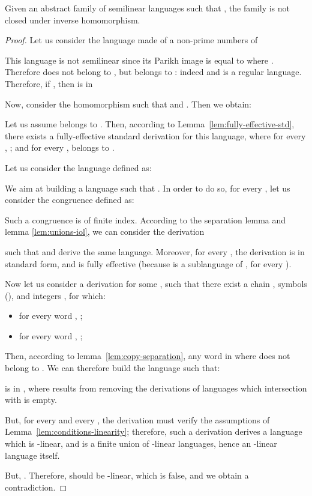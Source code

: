 \begin{theorem}
Given an abstract family of semilinear languages  such that , the family  is not closed under inverse homomorphism.
\end{theorem}
\begin{proof}
  Let us consider the language made of a non-prime numbers of 
  

  This language is not semilinear since its Parikh image is equal to  where .
  Therefore  does not belong to , but belongs to : indeed  and  is a regular language. Therefore, if , then  is in 

  Now, consider the homomorphism  such that  and . Then we obtain:
  
  
  Let us assume  belongs to .
  Then, according to Lemma~\ref{lem:fully-effective-std}, there exists a fully-effective standard derivation  for this language,  where for every , ; and for every   , belongs to .

  Let us consider the language  defined as:
  

We aim at building a language  such that . In order to do so, for every , let us consider the congruence  defined as:


Such a congruence is of finite index. According to the separation lemma and lemma \ref{lem:unions-iol}, we can consider the derivation

such that  and  derive the same language. Moreover, for every , the derivation  is in standard form, and is fully effective (because  is a sublanguage of , for every ).

Now let us consider a derivation  for some , such that there exist a chain , symbols  (), and integers , for which:
\begin{itemize}
  \item for every word , ;
  \item for every word , ;
\end{itemize}

Then, according to lemma~\ref{lem:copy-separation}, any word in  where  does not belong to . We can therefore build the language  such that:

is in , where  results from removing the derivations of languages which intersection with  is empty.

But, for every  and every , the derivation  must verify the assumptions of Lemma~\ref{lem:conditions-linearity}; therefore, such a derivation derives a language which is -linear, and  is a finite union of -linear languages, hence an -linear language itself.

But, . Therefore,  should be -linear, which is false, and we obtain a contradiction.





















\end{proof}

